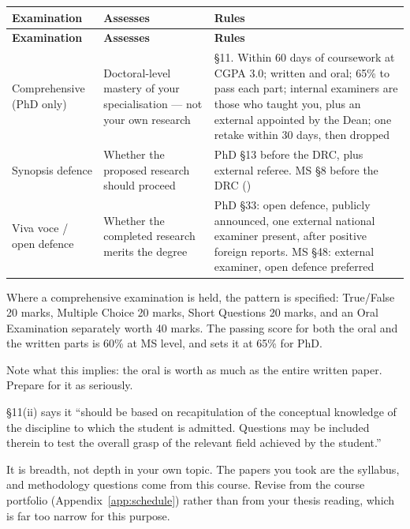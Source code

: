 \begin{center}
\small
\begin{longtable}{@{}L{3.0cm}L{5.2cm}L{6.0cm}@{}}
\toprule
\textbf{Examination} & \textbf{Assesses} & \textbf{Rules} \\
\midrule
\endfirsthead
\toprule
\textbf{Examination} & \textbf{Assesses} & \textbf{Rules} \\
\midrule
\endhead
\bottomrule
\endfoot
Comprehensive (PhD only)
  & Doctoral-level mastery of your specialisation --- not your own research
  & \S11. Within 60 days of coursework at CGPA 3.0; written and oral; 65\% to
    pass each part; internal examiners are those who taught you, plus an
    external appointed by the Dean; one retake within 30 days, then dropped \\
Synopsis defence
  & Whether the proposed research should proceed
  & PhD \S13 before the DRC, plus external referee. MS \S8 before the DRC
    () \\
Viva voce / open defence
  & Whether the completed research merits the degree
  & PhD \S33: open defence, publicly announced, one external national examiner
    present, after positive foreign reports. MS \S48: external examiner, open
    defence preferred \\
\end{longtable}
\end{center}

\begin{regbox}
Where a comprehensive examination is held, the pattern is specified: True/False
20 marks, Multiple Choice 20 marks, Short Questions 20 marks, and an Oral
Examination separately worth 40 marks. The passing score for both the oral and
the written parts is 60\% at MS level, and 
sets it at 65\% for PhD.

\medskip
Note what this implies: the oral is worth as much as the entire written paper.
Prepare for it as seriously.
\end{regbox}

\begin{conceptbox}
\S11(ii) says it ``should be based on recapitulation of the conceptual
knowledge of the discipline to which the student is admitted. Questions may be
included therein to test the overall grasp of the relevant field achieved by
the student.''

\medskip
It is breadth, not depth in your own topic. The papers you took are the
syllabus, and methodology questions come from this course. Revise from the
course portfolio (Appendix~\ref{app:schedule}) rather than from your thesis
reading, which is far too narrow for this purpose.
\end{conceptbox}

